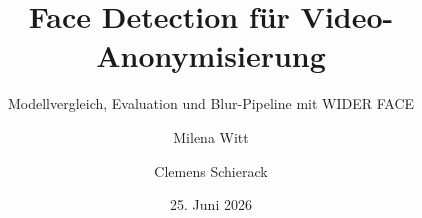 \title[Face Model Lab]{Face Detection f\"ur Video-Anonymisierung}
\subtitle[WIDER FACE]{Modellvergleich, Evaluation und Blur-Pipeline mit WIDER FACE}
\author{Milena Witt \and Clemens Schierack}
\newcommand{\faculty}{Fakult\"at Informatik und Medien}
\newcommand{\university}{HTWK Leipzig}
\newcommand{\universityLong}{Hochschule für Technik, Wirtschaft und Kultur Leipzig}
\date{25. Juni 2026}




